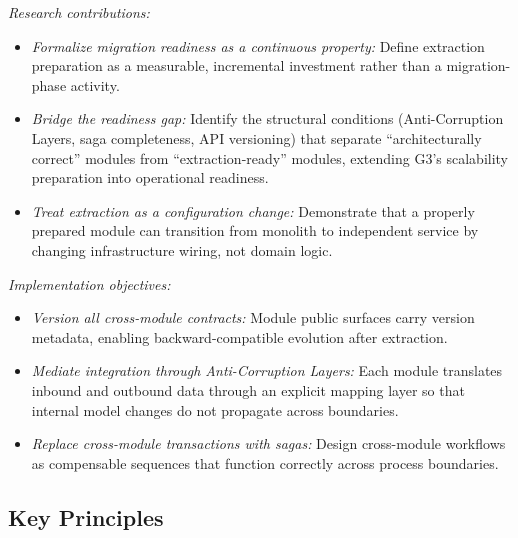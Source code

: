 \emph{Research contributions:}
\begin{itemize}[itemsep=8pt,topsep=2pt]
  \item \emph{Formalize migration readiness as a continuous property:} Define extraction preparation as a measurable, incremental investment rather than a migration-phase activity.
  \item \emph{Bridge the readiness gap:} Identify the structural conditions (Anti-Corruption Layers, saga completeness, API versioning) that separate ``architecturally correct'' modules from ``extraction-ready'' modules, extending G3's scalability preparation into operational readiness.
  \item \emph{Treat extraction as a configuration change:} Demonstrate that a properly prepared module can transition from monolith to independent service by changing infrastructure wiring, not domain logic.
\end{itemize}

\emph{Implementation objectives:}
\begin{itemize}[itemsep=8pt,topsep=2pt]
  \item \emph{Version all cross-module contracts:} Module public surfaces carry version metadata, enabling backward-compatible evolution after extraction.
  \item \emph{Mediate integration through Anti-Corruption Layers:} Each module translates inbound and outbound data through an explicit mapping layer so that internal model changes do not propagate across boundaries.
  \item \emph{Replace cross-module transactions with sagas:} Design cross-module workflows as compensable sequences that function correctly across process boundaries.
\end{itemize}

\subsection*{Key Principles}

